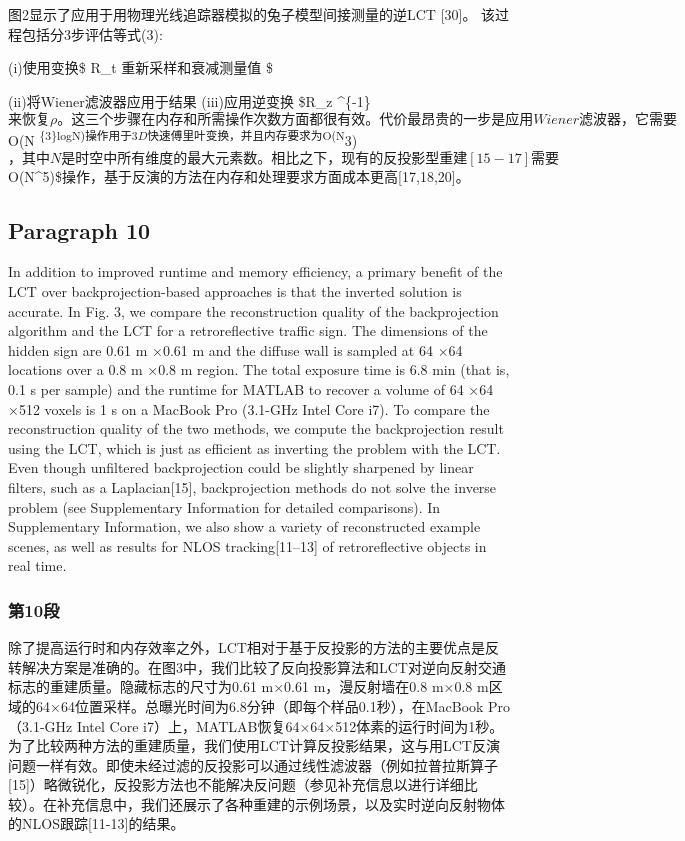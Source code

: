 \documentclass[11pt]{article}
\begin{document}
图2显示了应用于用物理光线追踪器模拟的兔子模型间接测量的逆LCT {[}30{]}。
该过程包括分3步评估等式(3):

(i)使用变换\$ R\_t \(重新采样和衰减测量值\) \tau \$

(ii)将Wiener滤波器应用于结果 (iii)应用逆变换 \$R\_z \^{}\{-1\}
\(来恢复ρ。 这三个步骤在内存和所需操作次数方面都很有效。 代价最昂贵的一步是应用Wiener滤波器，它需要\)
O(N
\textsuperscript{\{3\}logN)\(操作用于3D快速傅里叶变换，并且内存要求为\)O(N}3)\(，其中N是时空中所有维度的最大元素数。相比之下，现有的反投影型重建[15-17]需要\)O(N\^{}5)\$操作，基于反演的方法在内存和处理要求方面成本更高{[}17,18,20{]}。

    \subsection{Paragraph 10}\label{paragraph-10}

In addition to improved runtime and memory efficiency, a primary benefit
of the LCT over backprojection-based approaches is that the inverted
solution is accurate. In Fig. 3, we compare the reconstruction quality
of the backprojection algorithm and the LCT for a retroreflective
traffic sign. The dimensions of the hidden sign are 0.61 m ×0.61 m and
the diffuse wall is sampled at 64 ×64 locations over a 0.8 m ×0.8 m
region. The total exposure time is 6.8 min (that is, 0.1 s per sample)
and the runtime for MATLAB to recover a volume of 64 ×64 ×512 voxels is
1 s on a MacBook Pro (3.1-GHz Intel Core i7). To compare the
reconstruction quality of the two methods, we compute the backprojection
result using the LCT, which is just as efficient as inverting the
problem with the LCT. Even though unfiltered backprojection could be
slightly sharpened by linear filters, such as a Laplacian{[}15{]},
backprojection methods do not solve the inverse problem (see
Supplementary Information for detailed comparisons). In Supplementary
Information, we also show a variety of reconstructed example scenes, as
well as results for NLOS tracking{[}11--13{]} of retroreflective objects
in real time.

    \subsubsection{第10段}\label{ux7b2c10ux6bb5}

除了提高运行时和内存效率之外，LCT相对于基于反投影的方法的主要优点是反转解决方案是准确的。在图3中，我们比较了反向投影算法和LCT对逆向反射交通标志的重建质量。隐藏标志的尺寸为0.61
m×0.61 m，漫反射墙在0.8 m×0.8
m区域的64×64位置采样。总曝光时间为6.8分钟（即每个样品0.1秒），在MacBook
Pro（3.1-GHz Intel Core
i7）上，MATLAB恢复64×64×512体素的运行时间为1秒。为了比较两种方法的重建质量，我们使用LCT计算反投影结果，这与用LCT反演问题一样有效。即使未经过滤的反投影可以通过线性滤波器（例如拉普拉斯算子{[}15{]}）略微锐化，反投影方法也不能解决反问题（参见补充信息以进行详细比较）。在补充信息中，我们还展示了各种重建的示例场景，以及实时逆向反射物体的NLOS跟踪{[}11-13{]}的结果。
\end{document}
